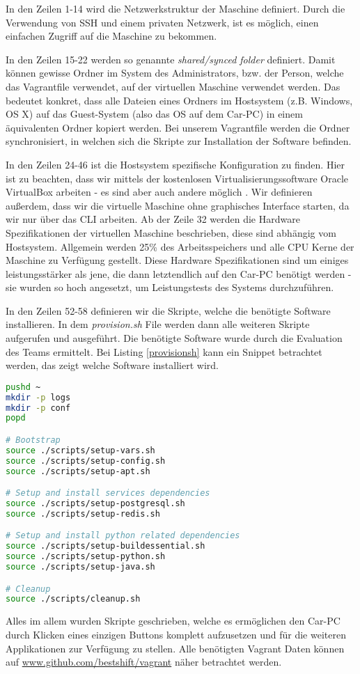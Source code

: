 In den Zeilen 1-14 wird die Netzwerkstruktur der Maschine definiert. Durch die Verwendung von SSH \cite{MELD.CH3-ssh.website} und einem privaten Netzwerk, ist es möglich, einen einfachen Zugriff auf die Maschine zu bekommen.

In den Zeilen 15-22 werden so genannte \textit{shared/synced folder} \cite{MELD.CH3-vagrant.syncedFolders} definiert. Damit können gewisse Ordner im System des Administrators, bzw. der Person, welche das Vagrantfile verwendet, auf der virtuellen Maschine verwendet werden. Das bedeutet konkret, dass alle Dateien eines Ordners im Hostsystem (z.B. Windows, OS X) auf das Guest-System (also das OS auf dem Car-PC) in einem äquivalenten Ordner kopiert werden. Bei unserem Vagrantfile werden die Ordner synchronisiert, in welchen sich die Skripte zur Installation der Software befinden.

In den Zeilen 24-46 ist die Hostsystem spezifische Konfiguration zu finden. Hier ist zu beachten, dass wir mittels der kostenlosen Virtualisierungssoftware Oracle VirtualBox \cite{MELD.CH3-virtualbox.website} arbeiten - es sind aber auch andere möglich \cite{MELD.CH3-vagrant.providers}. Wir definieren außerdem, dass wir die virtuelle Maschine ohne graphisches Interface starten, da wir nur über das CLI arbeiten. Ab der Zeile 32 werden die Hardware Spezifikationen der virtuellen Maschine beschrieben, diese sind abhängig vom Hostsystem. Allgemein werden 25\% des Arbeitsspeichers und alle CPU Kerne der Maschine zu Verfügung gestellt. Diese Hardware Spezifikationen sind um einiges leistungsstärker als jene, die dann letztendlich auf den Car-PC benötigt werden - sie wurden so hoch angesetzt, um Leistungstests des Systems durchzuführen.

In den Zeilen 52-58 definieren wir die Skripte, welche die benötigte Software installieren. In dem \textit{provision.sh} File werden dann alle weiteren Skripte aufgerufen und ausgeführt. Die benötigte Software wurde durch die Evaluation des Teams ermittelt. Bei Listing \ref{provisionsh} kann ein Snippet betrachtet werden, das zeigt welche Software installiert wird.

\clearpage

\begin{lstlisting}[language=bash, caption=provision.sh,label={provisionsh}]
pushd ~
mkdir -p logs
mkdir -p conf
popd

# Bootstrap
source ./scripts/setup-vars.sh
source ./scripts/setup-config.sh
source ./scripts/setup-apt.sh

# Setup and install services dependencies
source ./scripts/setup-postgresql.sh
source ./scripts/setup-redis.sh

# Setup and install python related dependencies
source ./scripts/setup-buildessential.sh
source ./scripts/setup-python.sh
source ./scripts/setup-java.sh

# Cleanup
source ./scripts/cleanup.sh
\end{lstlisting}

Alles im allem wurden Skripte geschrieben, welche es ermöglichen den Car-PC durch Klicken eines einzigen Buttons komplett aufzusetzen und für die weiteren Applikationen zur Verfügung zu stellen. Alle benötigten Vagrant Daten können auf \url{www.github.com/bestshift/vagrant} näher betrachtet werden.